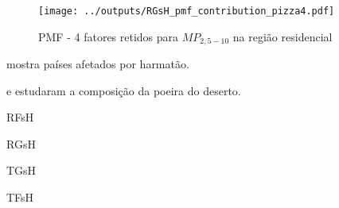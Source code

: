 \begin{figure}[H]
\begin{center}
  \texttt{[image: ../outputs/RGsH\_pmf\_contribution\_pizza4.pdf]}
  \caption{PMF - 4 fatores retidos para $MP_{2,5-10}$ na região residencial}
\end{center}
\end{figure}

\citep{kaku2016}

\citep{prospero2002} mostra países afetados por harmatão. 

\citep{engelbrecht2009a} e \citep{engelbrecht2009b} estudaram a composição 
da poeira do deserto.


\begin{table}[H]
  \centering
  \caption{RFsH}
  
\end{table}

\begin{table}[H]
  \centering
  \caption{RGsH}
  
\end{table}

\begin{table}[H]
  \centering
  \caption{TGsH}
  
\end{table}


\begin{table}[H]
  \centering
  \caption{TFsH}
  
\end{table}



%
%
%
%
